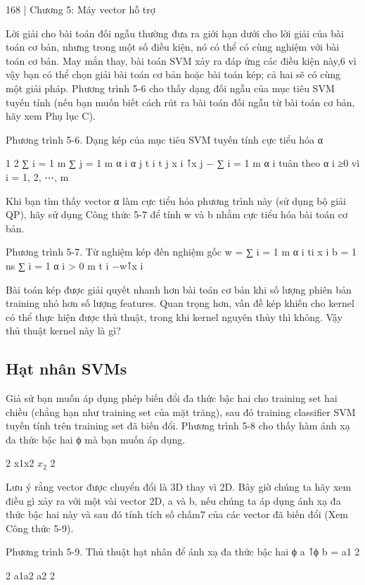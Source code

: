 168 | Chương 5: Máy vector hỗ trợ

Lời giải cho bài toán đối ngẫu thường đưa ra giới hạn dưới cho lời giải của bài toán cơ bản, nhưng trong một số điều kiện, nó có thể có cùng nghiệm với bài toán cơ bản. May mắn thay, bài toán SVM xảy ra đáp ứng các điều kiện này,6 vì vậy bạn có thể chọn giải bài toán cơ bản hoặc bài toán kép; cả hai sẽ có cùng một giải pháp. Phương trình 5-6 cho thấy dạng đối ngẫu của mục tiêu SVM tuyến tính (nếu bạn muốn biết cách rút ra bài toán đối ngẫu từ bài toán cơ bản, hãy xem Phụ lục C).

Phương trình 5-6. Dạng kép của mục tiêu SVM tuyến tính cực tiểu hóa α

1 2 ∑ i = 1 m ∑ j = 1 m α i α j t i t j x i ⊺x j − ∑ i = 1 m α i tuân theo α i ≥0 vì i = 1, 2, ⋯, m

Khi bạn tìm thấy vector α làm cực tiểu hóa phương trình này (sử dụng bộ giải QP), hãy sử dụng Công thức 5-7 để tính w và b nhằm cực tiểu hóa bài toán cơ bản.

Phương trình 5-7. Từ nghiệm kép đến nghiệm gốc w = ∑ i = 1 m α i ti x i b = 1 ns ∑ i = 1 α i > 0 m t i −w⊺x i

Bài toán kép được giải quyết nhanh hơn bài toán cơ bản khi số lượng phiên bản training nhỏ hơn số lượng features. Quan trọng hơn, vấn đề kép khiến cho kernel có thể thực hiện được thủ thuật, trong khi kernel nguyên thủy thì không. Vậy thủ thuật kernel này là gì?

\subsection{Hạt nhân SVMs}

Giả sử bạn muốn áp dụng phép biến đổi đa thức bậc hai cho training set hai chiều (chẳng hạn như training set của mặt trăng), sau đó training classifier SVM tuyến tính trên training set đã biến đổi. Phương trình 5-8 cho thấy hàm ánh xạ đa thức bậc hai ϕ mà bạn muốn áp dụng.

2 x1x2 $x_{2}$ 2

Lưu ý rằng vector được chuyển đổi là 3D thay vì 2D. Bây giờ chúng ta hãy xem điều gì xảy ra với một vài vector 2D, a và b, nếu chúng ta áp dụng ánh xạ đa thức bậc hai này và sau đó tính tích số chấm7 của các vector đã biến đổi (Xem Công thức 5-9).

Phương trình 5-9. Thủ thuật hạt nhân để ánh xạ đa thức bậc hai ϕ a ⊺ϕ b = a1 2

2 a1a2 a2 2

